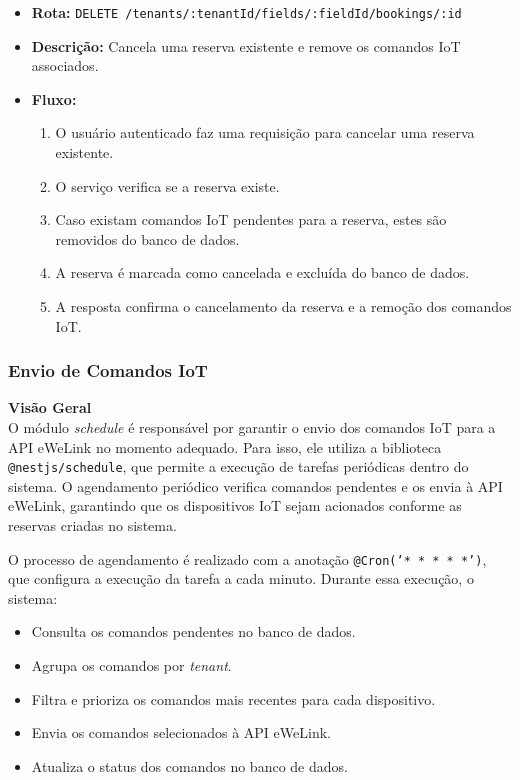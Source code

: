 \begin{itemize}
    \item \textbf{Rota:} \texttt{DELETE /tenants/:tenantId/fields/:fieldId/bookings/:id}
    \item \textbf{Descrição:} Cancela uma reserva existente e remove os comandos IoT associados.
    \item \textbf{Fluxo:}
    \begin{enumerate}
        \item O usuário autenticado faz uma requisição para cancelar uma reserva existente.
        \item O serviço verifica se a reserva existe.
        \item Caso existam comandos IoT pendentes para a reserva, estes são removidos do banco de dados.
        \item A reserva é marcada como cancelada e excluída do banco de dados.
        \item A resposta confirma o cancelamento da reserva e a remoção dos comandos IoT.
    \end{enumerate}
\end{itemize}

\subsubsection{Envio de Comandos IoT}\label{subsubsec:envio_comandos_iot}

\noindent\textbf{Visão Geral}\\
O módulo \textit{schedule} é responsável por garantir o envio dos comandos IoT para a API eWeLink no momento adequado. Para isso, ele utiliza a biblioteca \texttt{@nestjs/schedule}, que permite a execução de tarefas periódicas dentro do sistema. O agendamento periódico verifica comandos pendentes e os envia à API eWeLink, garantindo que os dispositivos IoT sejam acionados conforme as reservas criadas no sistema.

O processo de agendamento é realizado com a anotação \texttt{@Cron('* * * * *')}, que configura a execução da tarefa a cada minuto. Durante essa execução, o sistema:

\begin{itemize}
    \item Consulta os comandos pendentes no banco de dados.
    \item Agrupa os comandos por \textit{tenant}.
    \item Filtra e prioriza os comandos mais recentes para cada dispositivo.
    \item Envia os comandos selecionados à API eWeLink.
    \item Atualiza o status dos comandos no banco de dados.
\end{itemize}

